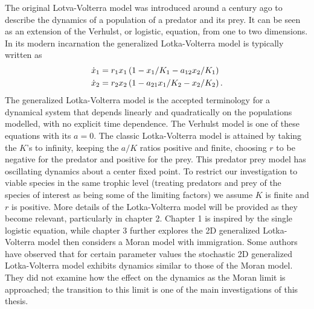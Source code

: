 The original Lotva-Volterra model was introduced around a century ago to describe the dynamics of a population of a predator and its prey.
It can be seen as an extension of the Verhulst, or logistic, equation, from one to two dimensions. %
In its modern incarnation the generalized Lotka-Volterra model is typically written as 
\begin{align}
\dot{x}_1 &= r_1 x_1 \left(1 - x_1/K_1 - a_{12}x_2/K_1\right) \\
\dot{x}_2 &= r_2 x_2 \left(1 - a_{21}x_1/K_2 - x_2/K_2\right). \notag 
\end{align} \label{LVeqns}
The generalized Lotka-Volterra model is the accepted terminology for a dynamical system that depends linearly and quadratically on the populations modelled, with no explicit time dependence. 
The Verhulst model is one of these equations with its $a=0$. 
The classic Lotka-Volterra model is attained by taking the $K$'s to infinity, keeping the $a/K$ ratios positive and finite, choosing $r$ to be negative for the predator and positive for the prey. 
This predator prey model has oscillating dynamics about a center fixed point. 
To restrict our investigation to viable species in the same trophic level (treating predators and prey of the species of interest as being some of the limiting factors) we assume $K$ is finite and $r$ is positive. 
More details of the Lotka-Volterra model will be provided as they become relevant, particularly in chapter 2. %
Chapter 1 is inspired by the single logistic equation, while chapter 3 further explores the 2D generalized Lotka-Volterra model then considers a Moran model with immigration. 
Some authors \cite{Lin2012,Constable2015,Chotibut2015,Young2018} have observed that for certain parameter values the stochastic 2D generalized Lotka-Volterra model exhibits dynamics similar to those of the Moran model. 
They did not examine how the effect on the dynamics as the Moran limit is approached; the transition to this limit is one of the main investigations of this thesis. 

